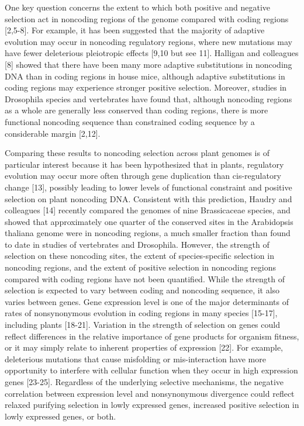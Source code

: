 One key question concerns the extent to which both positive and negative selection act in noncoding regions of the genome compared with coding regions [2,5-8]. For example, it has been suggested that the majority of adaptive evolution may occur in noncoding regulatory regions, where new mutations may have fewer deleterious pleiotropic effects [9,10 but see 11]. Halligan and colleagues [8] showed that there have been many more adaptive substitutions in noncoding DNA than in coding regions in house mice, although adaptive substitutions in coding regions may experience stronger positive selection. Moreover, studies in Drosophila species and vertebrates have found that, although noncoding regions as a whole are generally less conserved than coding regions, there is more functional noncoding sequence than constrained coding sequence by a considerable margin [2,12]. 

Comparing these results to noncoding selection across plant genomes is of particular interest because it has been hypothesized that in plants, regulatory evolution may occur more often through gene duplication than cis-regulatory change [13], possibly leading to lower levels of functional constraint and positive selection on plant noncoding DNA. Consistent with this prediction, Haudry and colleagues [14] recently compared the genomes of nine Brassicaceae species, and showed that approximately one quarter of the conserved sites in the Arabidopsis thaliana genome were in noncoding regions, a much smaller fraction than found to date in studies of vertebrates and Drosophila. However, the strength of selection on these noncoding sites, the extent of species-specific selection in noncoding regions, and the extent of positive selection in noncoding regions compared with coding regions have not been quantified. 
While the strength of selection is expected to vary between coding and noncoding sequence, it also varies between genes. Gene expression level is one of the major determinants of rates of nonsynonymous evolution in coding regions in many species [15-17], including plants [18-21]. Variation in the strength of selection on genes could reflect differences in the relative importance of gene products for organism fitness, or it may simply relate to inherent properties of expression [22]. For example, deleterious mutations that cause misfolding or mis-interaction have more opportunity to interfere with cellular function when they occur in high expression genes [23-25]. Regardless of the underlying selective mechanisms, the negative correlation between expression level and nonsynonymous divergence could reflect relaxed purifying selection in lowly expressed genes, increased positive selection in lowly expressed genes, or both.

